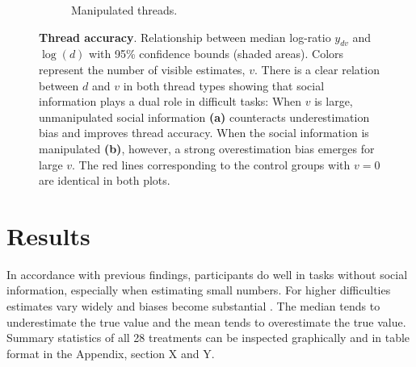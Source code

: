 \documentclass[9pt,twocolumn,twoside,lineno]{pnas-new}
\begin{document}
\begin{figure}[!h]
\begin{subfigure}[t]{.46\linewidth}
		\caption{\footnotesize Manipulated threads.}
		\label{fig: median confidence bounds - manipulated}
	\end{subfigure}
	\caption{\textbf{Thread accuracy}. Relationship between median log-ratio $y_{dv}$ and $\log(d)$ with 95\% confidence bounds (shaded areas). Colors represent the number of visible estimates, $v$. There is a clear relation between $d$ and $v$ in both thread types showing that social information plays a dual role in difficult tasks: When $v$ is large, unmanipulated social information \textbf{(a)} counteracts underestimation bias and improves thread accuracy. When the social information is manipulated \textbf{(b)}, however, a strong overestimation bias emerges for large $v$. The red lines corresponding to the control groups with $v=0$ are identical in both plots.}
	\label{fig: median confidence bounds}
\end{figure}

\section*{Results}
In accordance with previous findings, participants do well in tasks without social information, especially when estimating small numbers. For higher difficulties estimates vary widely and biases become substantial \cite{indow1977scaling, izard2008calibrating, krueger1982single, krueger1984perceived, kao2018counteracting}. The median tends to underestimate the true value and the mean tends to overestimate the true value. Summary statistics of all 28 treatments can be inspected graphically and in table format in the Appendix, section X and Y.

\end{document}
